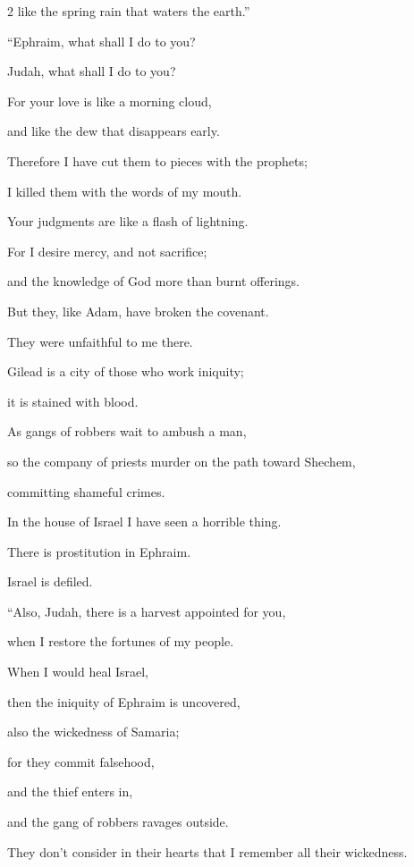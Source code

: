 \begin{multicols}{2}
like the spring rain that waters the earth.”


\vspace{\baselineskip} \myverse{}“Ephraim, what shall I do to you?

Judah, what shall I do to you?

For your love is like a morning cloud,

and like the dew that disappears early.

\myverse{}Therefore I have cut them to pieces with the prophets;

I killed them with the words of my mouth.

Your judgments are like a flash of lightning.

\myverse{}For I desire mercy, and not sacrifice;

and the knowledge of God more than burnt offerings.

\myverse{}But they, like Adam, have broken the covenant.

They were unfaithful to me there.

\myverse{}Gilead is a city of those who work iniquity;

it is stained with blood.

\myverse{}As gangs of robbers wait to ambush a man,

so the company of priests murder on the path toward Shechem,

committing shameful crimes.

\myverse{}In the house of Israel I have seen a horrible thing.

There is prostitution in Ephraim.

Israel is defiled.


\vspace{\baselineskip} \myverse{}“Also, Judah, there is a harvest appointed for you,

when I restore the fortunes of my people.


\mychapter{} \myverse*{}When I would heal Israel,

then the iniquity of Ephraim is uncovered,

also the wickedness of Samaria;

for they commit falsehood,

and the thief enters in,

and the gang of robbers ravages outside.

\myverse{}They don’t consider in their hearts that I remember all their
wickedness.


\end{multicols}
